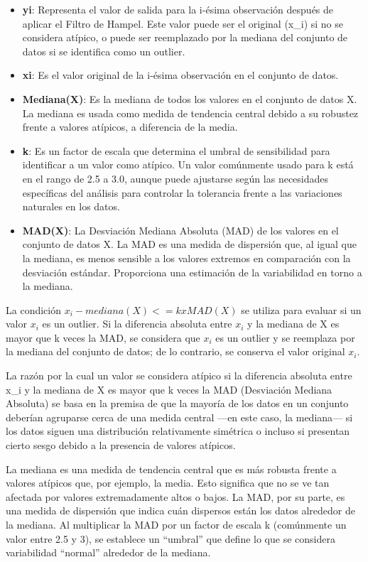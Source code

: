 \documentclass[
  11pt,
  bookmarksnumbered]{article}
\begin{document}
\begin{itemize}
\item
  \textbf{yi}: Representa el valor de salida para la i-ésima observación después de aplicar el Filtro de Hampel.
  Este valor puede ser el original (x\_i) si no se considera atípico, o puede ser reemplazado por la mediana del conjunto de datos si se identifica como un outlier.
\item
  \textbf{xi}: Es el valor original de la i-ésima observación en el conjunto de datos.
\item
  \textbf{Mediana(X)}: Es la mediana de todos los valores en el conjunto de datos X.
  La mediana es usada como medida de tendencia central debido a su robustez frente a valores atípicos, a diferencia de la media.
\item
  \textbf{k}: Es un factor de escala que determina el umbral de sensibilidad para identificar a un valor como atípico.
  Un valor comúnmente usado para k está en el rango de 2.5 a 3.0, aunque puede ajustarse según las necesidades específicas del análisis para controlar la tolerancia frente a las variaciones naturales en los datos.
\item
  \textbf{MAD(X)}: La Desviación Mediana Absoluta (MAD) de los valores en el conjunto de datos X.
  La MAD es una medida de dispersión que, al igual que la mediana, es menos sensible a los valores extremos en comparación con la desviación estándar.
  Proporciona una estimación de la variabilidad en torno a la mediana.
\end{itemize}

La condición \(x_i - mediana(X) <= k x MAD(X)\) se utiliza para evaluar si un valor \(x_i\) es un outlier.
Si la diferencia absoluta entre \(x_i\) y la mediana de X es mayor que k veces la MAD, se considera que \(x_i\) es un outlier y se reemplaza por la mediana del conjunto de datos; de lo contrario, se conserva el valor original \(x_i\).

La razón por la cual un valor se considera atípico si la diferencia absoluta entre x\_i y la mediana de X es mayor que k veces la MAD (Desviación Mediana Absoluta) se basa en la premisa de que la mayoría de los datos en un conjunto deberían agruparse cerca de una medida central ---en este caso, la mediana--- si los datos siguen una distribución relativamente simétrica o incluso si presentan cierto sesgo debido a la presencia de valores atípicos.

La mediana es una medida de tendencia central que es más robusta frente a valores atípicos que, por ejemplo, la media.
Esto significa que no se ve tan afectada por valores extremadamente altos o bajos.
La MAD, por su parte, es una medida de dispersión que indica cuán dispersos están los datos alrededor de la mediana.
Al multiplicar la MAD por un factor de escala k (comúnmente un valor entre 2.5 y 3), se establece un ``umbral'' que define lo que se considera variabilidad ``normal'' alrededor de la mediana.
\end{document}
